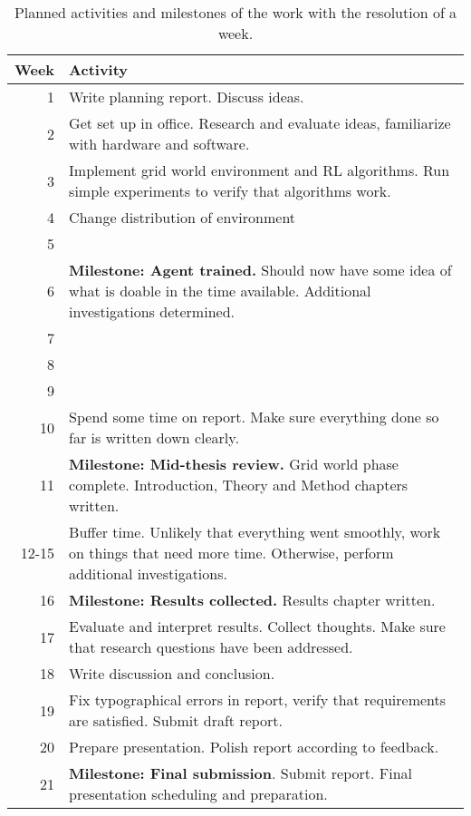 \documentclass{article}
\begin{document}
\begin{table}
    \caption{Planned activities and milestones of the work with the resolution of a week.}
    \label{tab:timeplan}
    \centering
    \begin{tabular}{r p{.80\linewidth}}
        \toprule
        Week & Activity \\
        \midrule
        1 &
        Write planning report. Discuss ideas.
        \\
        2 & Get set up in office. Research and evaluate ideas, familiarize with hardware and software.
        \\
        3 &
        Implement grid world environment and RL algorithms. Run simple experiments to verify that algorithms work.
        \\
        4 &
        Change distribution of environment \\
        5 &
        
        \\
        6 & \textbf{Milestone: Agent trained.} Should now have some idea of what is doable in the time available. Additional investigations determined.
        \\
        7 &
        
        \\
        8 &
         \\
        9 &
        
        \\
        10 &
        Spend some time on report. Make sure everything done so far is written down clearly.
        \\
        11 & \textbf{Milestone: Mid-thesis review.}
        Grid world phase complete. Introduction, Theory and Method chapters written. \\
        12-15 &
        Buffer time. Unlikely that everything went smoothly, work on things that need more time. Otherwise, perform additional investigations.
        \\
        16 & \textbf{Milestone: Results collected.}
        Results chapter written.
        \\
        17 &
        Evaluate and interpret results. Collect thoughts. Make sure that research questions have been addressed.
        \\
        18 &
        Write discussion and conclusion.
        \\
        19 &
        Fix typographical errors in report, verify that requirements are satisfied. Submit draft report.
        \\
        20 &
        Prepare presentation. Polish report according to feedback.
        \\
        21 & \textbf{Milestone: Final submission}.
        Submit report. Final presentation scheduling and preparation.\\
        \bottomrule
    \end{tabular}
\end{table}



\end{document}
